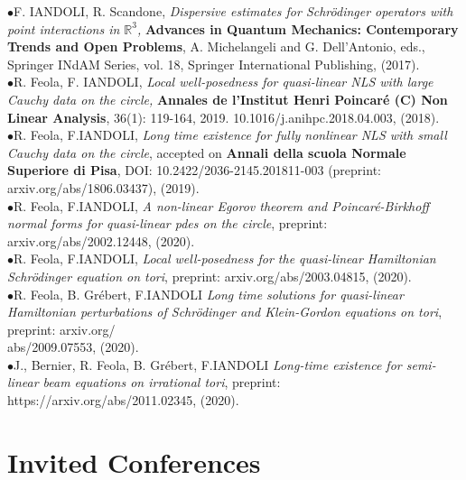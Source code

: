 \documentclass[margin,line,pifont,palatino,courier]{res}
\begin{document}
\begin{resume}
$\bullet${\rm{F. IANDOLI, R. Scandone}},  \textit{Dispersive estimates for Schr\"odinger operators with point interactions in $\mathbb{R}^3$,}  {\textbf {Advances in Quantum Mechanics: Contemporary Trends and Open Problems}}, A. Michelangeli and G. Dell'Antonio, eds., Springer INdAM Series, vol. 18, Springer International Publishing, (2017).\vspace{0.1cm}\\
$\bullet${\rm{R. Feola, F. IANDOLI}},  \textit{Local well-posedness for quasi-linear NLS with large Cauchy data on the circle,}  \textbf{Annales de l'Institut Henri Poincar\'e (C) Non Linear Analysis}, 36(1): 119-164, 2019. 10.1016/j.anihpc.2018.04.003, (2018).\vspace{0.1cm}\\
$\bullet${\rm{R. Feola, F.IANDOLI}}, \textit{Long time existence for fully nonlinear NLS with small Cauchy data on the circle}, accepted on  \textbf{Annali della scuola Normale Superiore di Pisa}, DOI: 10.2422/2036-2145.201811-003 (preprint: arxiv.org/abs/1806.03437), 
(2019).\vspace{0.1cm}\\
$\bullet${\rm{R. Feola, F.IANDOLI}}, \textit{A non-linear Egorov theorem and Poincar\'e-Birkhoff normal forms for quasi-linear pdes on the circle}, preprint: arxiv.org/abs/2002.12448, (2020).\vspace{0.1cm}\\
$\bullet${\rm{R. Feola, F.IANDOLI}}, \textit{Local well-posedness for the quasi-linear Hamiltonian Schr\"odinger equation on tori}, preprint: arxiv.org/abs/2003.04815, (2020).\vspace{0.1cm}\\
$\bullet${\rm{R. Feola, B. Gr\'ebert, F.IANDOLI}} \textit{Long time solutions for quasi-linear Hamiltonian perturbations of Schr\"odinger and Klein-Gordon equations on tori}, preprint: arxiv.org/\\abs/2009.07553, (2020). \vspace{0.1cm}\\
$\bullet${\rm{J., Bernier, R. Feola, B. Gr\'ebert, F.IANDOLI}} \textit{Long-time existence for semi-linear beam equations on irrational tori}, preprint: https://arxiv.org/abs/2011.02345, (2020). \vspace{0.1cm}\\



\section{\sc Invited Conferences}


\end{resume}
\end{document}
